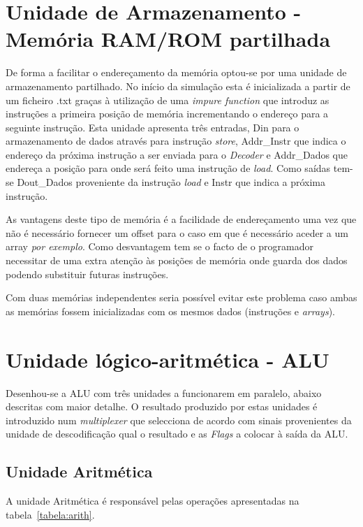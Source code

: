 \section{Unidade de Armazenamento - Memória RAM/ROM partilhada}

De forma a facilitar o endereçamento da memória optou-se por uma unidade de armazenamento partilhado. No início da simulação esta é inicializada a partir de um ficheiro .txt graças à utilização de uma \textit{impure function} que introduz as instruções a primeira posição de memória incrementando o endereço para a seguinte instrução. 
Esta unidade apresenta três entradas, Din para o armazenamento de dados através para instrução \textit{store}, Addr\_Instr que indica o endereço da próxima instrução a ser enviada para o \textit{Decoder} e Addr\_Dados que endereça a posição para onde será feito uma instrução de \textit{load}.
Como saídas tem-se Dout\_Dados proveniente da instrução \textit{load} e Instr que indica a próxima instrução.

As vantagens deste tipo de memória é a facilidade de endereçamento uma vez que não é necessário fornecer um offset para o caso em que é necessário aceder a um array \textit{por exemplo}. Como desvantagem tem se o facto de o programador necessitar de uma extra atenção às posições de memória onde guarda dos dados podendo substituir futuras instruções.

Com duas memórias independentes seria possível evitar este problema caso ambas as memórias fossem inicializadas com os mesmos dados (instruções e \textit{arrays}).

\section{Unidade lógico-aritmética - ALU}

Desenhou-se a ALU com três unidades a funcionarem em paralelo, abaixo descritas com maior detalhe.
O resultado produzido por estas unidades é introduzido num \textit{multiplexer} que selecciona de acordo com sinais provenientes da unidade de descodificação qual o resultado e as \textit{Flags} a colocar à saída da ALU.


\subsection{Unidade Aritmética}
A unidade Aritmética é responsável pelas operações apresentadas na tabela~\ref{tabela:arith}.


